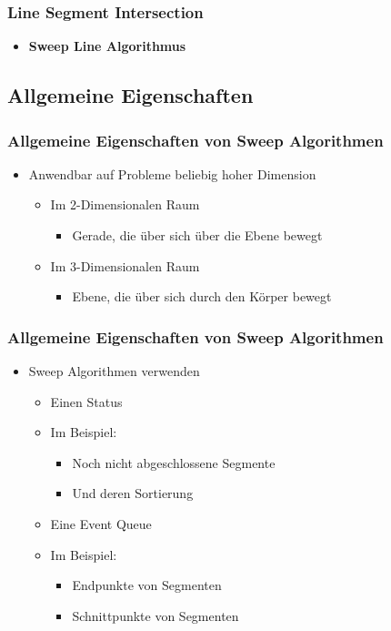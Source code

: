 \begin{frame}
	\frametitle{{Line Segment Intersection}}
	\begin{itemize}
		\item \textbf{Sweep Line Algorithmus}
	\end{itemize}
\end{frame}

\subsection{Allgemeine Eigenschaften}
\begin{frame}
	\frametitle{{Allgemeine Eigenschaften von Sweep Algorithmen}}
	\begin{itemize}
		\item Anwendbar auf Probleme beliebig hoher Dimension
		\begin{itemize}
			\pause
			\item{Im 2-Dimensionalen Raum}
			\begin{itemize}
				\item{Gerade, die über sich über die Ebene bewegt}
			\end{itemize}
			\pause
			\item{Im 3-Dimensionalen Raum}
			\begin{itemize}
				\item{Ebene, die über sich durch den K\"orper bewegt}
			\end{itemize}
			\pause
		\end{itemize}
	\end{itemize}
\end{frame}
\begin{frame}
	\frametitle{{Allgemeine Eigenschaften von Sweep Algorithmen}}
	\begin{itemize}
		\item{Sweep Algorithmen verwenden}
		\pause		
		\begin{itemize}
			\item{Einen Status}
			\pause
			\item{Im Beispiel:}
			\begin{itemize}
				\item{Noch nicht abgeschlossene Segmente}
				\pause
				\item{Und deren Sortierung}
			\end{itemize}
			\pause
			\item{Eine Event Queue}
			\pause
			\item{Im Beispiel:}
			\begin{itemize}
				\item{Endpunkte von Segmenten}
				\pause
				\item{Schnittpunkte von Segmenten}
			\end{itemize}
		\end{itemize}
	\end{itemize}
\end{frame}

